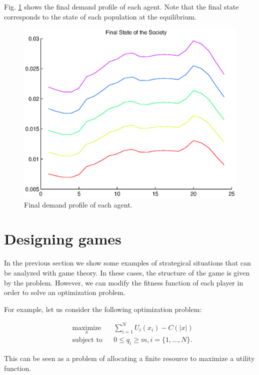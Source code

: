 \documentclass[a4paper,10pt]{article}
\begin{document}
Fig. \ref{fig:final_state} shows the final demand profile of each agent. Note that the final state corresponds to the state of each population at the equilibrium.

\begin{figure}[hbt]
 \centering
 \includegraphics[width=.75\textwidth]{./images/final_state.eps}
 \caption{Final demand profile of each agent.}
 \label{fig:final_state}
\end{figure}






\iffalse

\section{Designing games}

In the previous section we show some examples of strategical situations that can be analyzed with game theory. In these cases, the structure of the game is given by the problem. However, we can modify the fitness function of each player in order to solve an optimization problem.

For example, let us consider the following optimization problem:

\begin{equation}\label{eq:opt_problem}
\begin{aligned}
& \underset{x}{\text{maximize}} 
& & \sum_{i=1}^N U_i(x_i)  - C(|x|)\\
& \text{subject to}
& & 0 \leq q_i \geq m,  i =\{1,\ldots, N\}.
\end{aligned}
\end{equation}

This can be seen as a problem of allocating a finite resource to maximize a utility function. 
\end{document}
